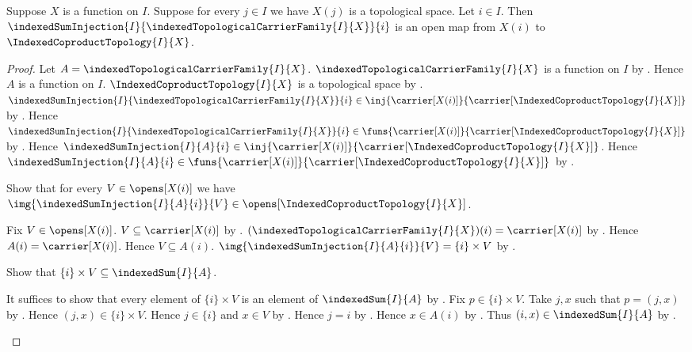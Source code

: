 \begin{theorem}\label{indexed_coproduct_injection_is_open_map}
    Suppose $X$ is a function on $I$.
    Suppose for every $j\in I$ we have $X(j)$ is a topological space.
    Let $i\in I$.
    Then $\indexedSumInjection{I}{
        \indexedTopologicalCarrierFamily{I}{X}}{i}$ is an open map from
        $X(i)$ to $\IndexedCoproductTopology{I}{X}$.
\end{theorem}
\begin{proof}
    Let $A=\indexedTopologicalCarrierFamily{I}{X}$.
    $\indexedTopologicalCarrierFamily{I}{X}$ is a function on $I$ by
        .
    Hence $A$ is a function on $I$.
    $\IndexedCoproductTopology{I}{X}$ is a topological space by
        .
    $\indexedSumInjection{I}{
        \indexedTopologicalCarrierFamily{I}{X}}{i}
        \in\inj{\carrier[X(i)]}{
            \carrier[\IndexedCoproductTopology{I}{X}]}$ by
        .
    Hence $\indexedSumInjection{I}{
        \indexedTopologicalCarrierFamily{I}{X}}{i}
        \in\funs{\carrier[X(i)]}{
            \carrier[\IndexedCoproductTopology{I}{X}]}$ by .
    Hence $\indexedSumInjection{I}{A}{i}
        \in\inj{\carrier[X(i)]}{
            \carrier[\IndexedCoproductTopology{I}{X}]}$.
    Hence $\indexedSumInjection{I}{A}{i}
        \in\funs{\carrier[X(i)]}{
            \carrier[\IndexedCoproductTopology{I}{X}]}$ by .

    Show that for every $V\in\opens[X(i)]$ we have
        $\img{\indexedSumInjection{I}{A}{i}}{V}
            \in\opens[\IndexedCoproductTopology{I}{X}]$.
    \begin{subproof}
        Fix $V\in\opens[X(i)]$.
        $V\subseteq\carrier[X(i)]$ by .
        $(\indexedTopologicalCarrierFamily{I}{X})(i)
            =\carrier[X(i)]$ by
            .
        Hence $A(i)=\carrier[X(i)]$.
        Hence $V\subseteq A(i)$.
        $\img{\indexedSumInjection{I}{A}{i}}{V}=\{i\}\times V$ by
            .

        Show that $\{i\}\times V\subseteq\indexedSum{I}{A}$.
        \begin{subproof}
            It suffices to show that every element of $\{i\}\times V$
                is an element of $\indexedSum{I}{A}$ by .
            Fix $p\in\{i\}\times V$.
            Take $j,x$ such that $p=(j,x)$ by
                .
            Hence $(j,x)\in\{i\}\times V$.
            Hence $j\in\{i\}$ and $x\in V$ by
                .
            Hence $j=i$ by .
            Hence $x\in A(i)$ by .
            Thus $(i,x)\in\indexedSum{I}{A}$ by
                .
        \end{subproof}


\end{subproof}
\end{proof}
